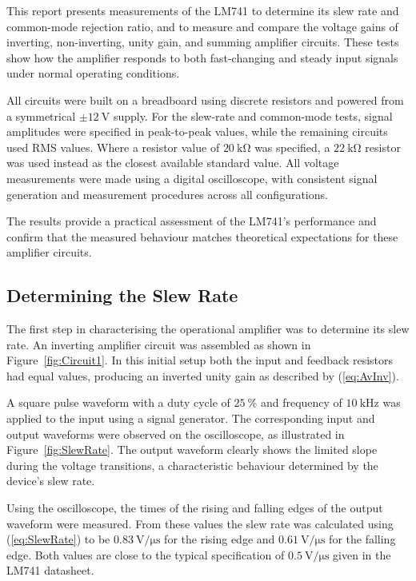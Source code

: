 \documentclass[conference]{IEEEtran}
\begin{document}
This report presents measurements of the LM741 to determine its slew rate and common-mode rejection ratio, and to measure and compare the voltage gains of inverting, non-inverting, unity gain, and summing amplifier circuits.  
These tests show how the amplifier responds to both fast-changing and steady input signals under normal operating conditions.  

All circuits were built on a breadboard using discrete resistors and powered from a symmetrical \(\pm\qty{12}{\volt}\) supply.  
For the slew-rate and common-mode tests, signal amplitudes were specified in peak-to-peak values, while the remaining circuits used RMS values.  
Where a resistor value of \(\qty{20}{\kilo\ohm}\) was specified, a \(\qty{22}{\kilo\ohm}\) resistor was used instead as the closest available standard value.  
All voltage measurements were made using a digital oscilloscope, with consistent signal generation and measurement procedures across all configurations.  

The results provide a practical assessment of the LM741's performance and confirm that the measured behaviour matches theoretical expectations for these amplifier circuits.  


\subsection{Determining the Slew Rate}

The first step in characterising the operational amplifier was to determine its slew rate.  
An inverting amplifier circuit was assembled as shown in Figure~\ref{fig:Circuit1}.  
In this initial setup both the input and feedback resistors had equal values, producing an inverted unity gain as described by (\ref{eq:AvInv}).  

A square pulse waveform with a duty cycle of \(\qty{25}{\percent}\) and frequency of \(\qty{10}{\kilo\hertz}\) was applied to the input using a signal generator.  
The corresponding input and output waveforms were observed on the oscilloscope, as illustrated in Figure~\ref{fig:SlewRate}.  
The output waveform clearly shows the limited slope during the voltage transitions, a characteristic behaviour determined by the device’s slew rate.  

Using the oscilloscope, the times of the rising and falling edges of the output waveform were measured.  
From these values the slew rate was calculated using (\ref{eq:SlewRate}) to be \(\qty{0.83}{\volt\per\micro\second}\) for the rising edge and \(\qty{0.61}{\volt\per\micro\second}\) for the falling edge.  
Both values are close to the typical specification of \(\qty{0.5}{\volt\per\micro\second}\) given in the LM741 datasheet.  
\end{document}
